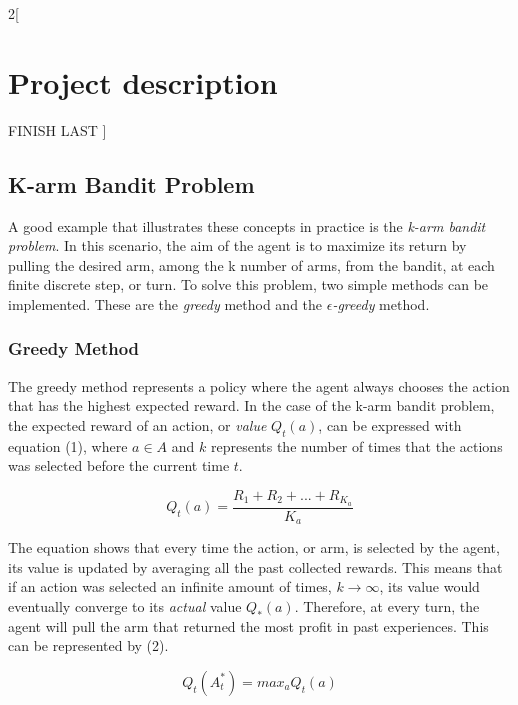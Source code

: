 \documentclass[a4paper]{article}
\begin{document}
\begin{multicols}{2}[
		\section*{Project description}
		FINISH LAST
		]
		\subsection{K-arm Bandit Problem}
		A good example that illustrates these concepts in practice is the \textit{k-arm bandit problem}. In this scenario, the aim of the agent is to maximize its return by pulling the desired arm, among the k number of arms, from the bandit, at each finite discrete step, or turn. To solve this problem, two simple methods can be implemented. These are the \textit{greedy} method and the \textit{$\epsilon$-greedy} method. \par
		
		\subsubsection{Greedy Method}
		The greedy method represents a policy where the agent always chooses the action that has the highest expected reward. In the case of the k-arm bandit problem, the expected reward of an action, or \textit{value} $Q_t(a)$, can be expressed with equation (1), where $a \in A$ and $k$ represents the number of times that the actions was selected before the current time $t$. \par
		
		\begin{equation}
			Q_t(a) = \frac{R_1 + R_2 + ... + R_{K_a}}{K_a}
		\end{equation}
		
		The equation shows that every time the action, or arm, is selected by the agent, its value is updated by averaging all the past collected rewards. This means that if an action was selected an infinite amount of times, $k\to\infty$, its value would eventually converge to its \textit{actual} value $Q_*(a)$. Therefore, at every turn, the agent will pull the arm that returned the most profit in past experiences. This can be represented by (2). \par
		
		\begin{equation}
			Q_t(A_t^*) = max_a Q_t(a)
		\end{equation}
		

\end{multicols}
\end{document}
